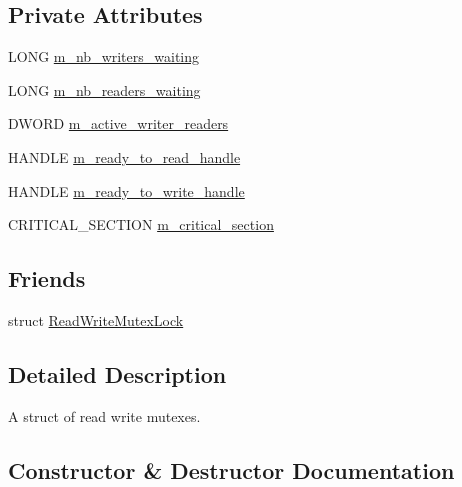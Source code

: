 \subsection*{Private Attributes}
\begin{DoxyCompactItemize}
\item 
L\+O\+NG \hyperlink{structmage_1_1_read_write_mutex_a003313794a9b43f80bd9b258b039438d}{m\+\_\+nb\+\_\+writers\+\_\+waiting}
\item 
L\+O\+NG \hyperlink{structmage_1_1_read_write_mutex_acbe7553fff7cca2656f6f2b8f0471484}{m\+\_\+nb\+\_\+readers\+\_\+waiting}
\item 
D\+W\+O\+RD \hyperlink{structmage_1_1_read_write_mutex_a1e0ad98e517236170faae5b27decfdce}{m\+\_\+active\+\_\+writer\+\_\+readers}
\item 
H\+A\+N\+D\+LE \hyperlink{structmage_1_1_read_write_mutex_a65c0ef8b687d48104b09a9d175e72236}{m\+\_\+ready\+\_\+to\+\_\+read\+\_\+handle}
\item 
H\+A\+N\+D\+LE \hyperlink{structmage_1_1_read_write_mutex_a9498ef85b52486342ba657f34369f89e}{m\+\_\+ready\+\_\+to\+\_\+write\+\_\+handle}
\item 
C\+R\+I\+T\+I\+C\+A\+L\+\_\+\+S\+E\+C\+T\+I\+ON \hyperlink{structmage_1_1_read_write_mutex_a77fe51b87e5205d60ea045fa53bc1fa3}{m\+\_\+critical\+\_\+section}
\end{DoxyCompactItemize}
\subsection*{Friends}
\begin{DoxyCompactItemize}
\item 
struct \hyperlink{structmage_1_1_read_write_mutex_a7ae207fc659160d3c55a5ba1468007f7}{Read\+Write\+Mutex\+Lock}
\end{DoxyCompactItemize}


\subsection{Detailed Description}
A struct of read write mutexes. 

\subsection{Constructor \& Destructor Documentation}
\hypertarget{structmage_1_1_read_write_mutex_aa206018373d39aef48b6e465909a75a5}{}\label{structmage_1_1_read_write_mutex_aa206018373d39aef48b6e465909a75a5} 
